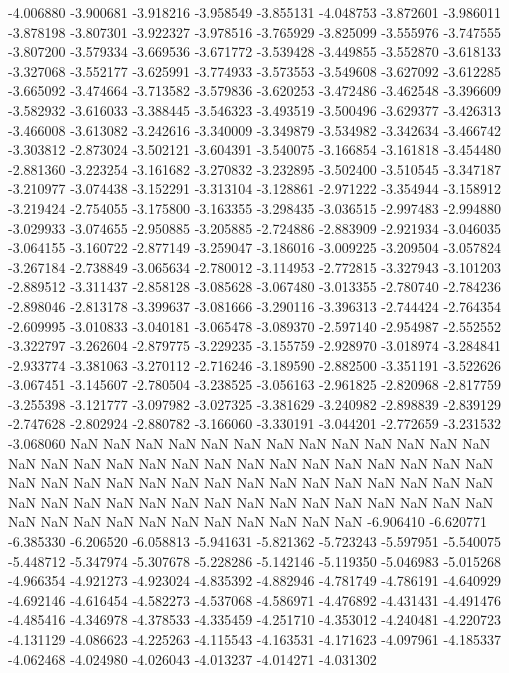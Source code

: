 -4.006880
-3.900681
-3.918216
-3.958549
-3.855131
-4.048753
-3.872601
-3.986011
-3.878198
-3.807301
-3.922327
-3.978516
-3.765929
-3.825099
-3.555976
-3.747555
-3.807200
-3.579334
-3.669536
-3.671772
-3.539428
-3.449855
-3.552870
-3.618133
-3.327068
-3.552177
-3.625991
-3.774933
-3.573553
-3.549608
-3.627092
-3.612285
-3.665092
-3.474664
-3.713582
-3.579836
-3.620253
-3.472486
-3.462548
-3.396609
-3.582932
-3.616033
-3.388445
-3.546323
-3.493519
-3.500496
-3.629377
-3.426313
-3.466008
-3.613082
-3.242616
-3.340009
-3.349879
-3.534982
-3.342634
-3.466742
-3.303812
-2.873024
-3.502121
-3.604391
-3.540075
-3.166854
-3.161818
-3.454480
-2.881360
-3.223254
-3.161682
-3.270832
-3.232895
-3.502400
-3.510545
-3.347187
-3.210977
-3.074438
-3.152291
-3.313104
-3.128861
-2.971222
-3.354944
-3.158912
-3.219424
-2.754055
-3.175800
-3.163355
-3.298435
-3.036515
-2.997483
-2.994880
-3.029933
-3.074655
-2.950885
-3.205885
-2.724886
-2.883909
-2.921934
-3.046035
-3.064155
-3.160722
-2.877149
-3.259047
-3.186016
-3.009225
-3.209504
-3.057824
-3.267184
-2.738849
-3.065634
-2.780012
-3.114953
-2.772815
-3.327943
-3.101203
-2.889512
-3.311437
-2.858128
-3.085628
-3.067480
-3.013355
-2.780740
-2.784236
-2.898046
-2.813178
-3.399637
-3.081666
-3.290116
-3.396313
-2.744424
-2.764354
-2.609995
-3.010833
-3.040181
-3.065478
-3.089370
-2.597140
-2.954987
-2.552552
-3.322797
-3.262604
-2.879775
-3.229235
-3.155759
-2.928970
-3.018974
-3.284841
-2.933774
-3.381063
-3.270112
-2.716246
-3.189590
-2.882500
-3.351191
-3.522626
-3.067451
-3.145607
-2.780504
-3.238525
-3.056163
-2.961825
-2.820968
-2.817759
-3.255398
-3.121777
-3.097982
-3.027325
-3.381629
-3.240982
-2.898839
-2.839129
-2.747628
-2.802924
-2.880782
-3.166060
-3.330191
-3.044201
-2.772659
-3.231532
-3.068060
NaN
NaN
NaN
NaN
NaN
NaN
NaN
NaN
NaN
NaN
NaN
NaN
NaN
NaN
NaN
NaN
NaN
NaN
NaN
NaN
NaN
NaN
NaN
NaN
NaN
NaN
NaN
NaN
NaN
NaN
NaN
NaN
NaN
NaN
NaN
NaN
NaN
NaN
NaN
NaN
NaN
NaN
NaN
NaN
NaN
NaN
NaN
NaN
NaN
NaN
NaN
NaN
NaN
NaN
NaN
NaN
NaN
NaN
NaN
NaN
NaN
NaN
NaN
NaN
NaN
NaN
NaN
NaN
NaN
-6.906410
-6.620771
-6.385330
-6.206520
-6.058813
-5.941631
-5.821362
-5.723243
-5.597951
-5.540075
-5.448712
-5.347974
-5.307678
-5.228286
-5.142146
-5.119350
-5.046983
-5.015268
-4.966354
-4.921273
-4.923024
-4.835392
-4.882946
-4.781749
-4.786191
-4.640929
-4.692146
-4.616454
-4.582273
-4.537068
-4.586971
-4.476892
-4.431431
-4.491476
-4.485416
-4.346978
-4.378533
-4.335459
-4.251710
-4.353012
-4.240481
-4.220723
-4.131129
-4.086623
-4.225263
-4.115543
-4.163531
-4.171623
-4.097961
-4.185337
-4.062468
-4.024980
-4.026043
-4.013237
-4.014271
-4.031302
